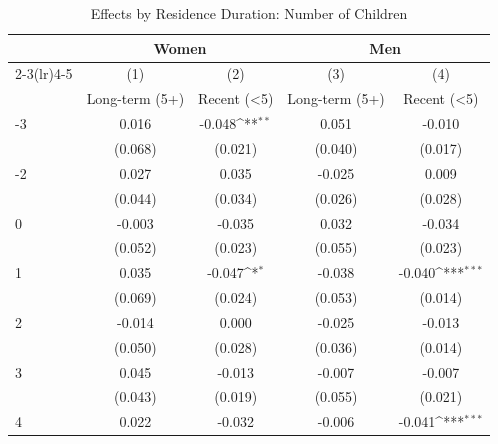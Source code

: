 \begin{table}[htbp]\centering
\def\sym#1{\ifmmode^{#1}\else\(^{#1}\)\fi}
\caption{Effects by Residence Duration: Number of Children}
\begin{tabular}{l*{4}{c}}
\hline\hline
            &\multicolumn{2}{c}{Women}                  &\multicolumn{2}{c}{Men}                    \\\cmidrule(lr){2-3}\cmidrule(lr){4-5}
            &\multicolumn{1}{c}{(1)}&\multicolumn{1}{c}{(2)}&\multicolumn{1}{c}{(3)}&\multicolumn{1}{c}{(4)}\\
            &\multicolumn{1}{c}{Long-term (5+)}&\multicolumn{1}{c}{Recent (<5)}&\multicolumn{1}{c}{Long-term (5+)}&\multicolumn{1}{c}{Recent (<5)}\\
\hline
-3          &       0.016         &      -0.048\sym{**} &       0.051         &      -0.010         \\
            &     (0.068)         &     (0.021)         &     (0.040)         &     (0.017)         \\
[1em]
-2          &       0.027         &       0.035         &      -0.025         &       0.009         \\
            &     (0.044)         &     (0.034)         &     (0.026)         &     (0.028)         \\
[1em]
0           &      -0.003         &      -0.035         &       0.032         &      -0.034         \\
            &     (0.052)         &     (0.023)         &     (0.055)         &     (0.023)         \\
[1em]
1           &       0.035         &      -0.047\sym{*}  &      -0.038         &      -0.040\sym{***}\\
            &     (0.069)         &     (0.024)         &     (0.053)         &     (0.014)         \\
[1em]
2           &      -0.014         &       0.000         &      -0.025         &      -0.013         \\
            &     (0.050)         &     (0.028)         &     (0.036)         &     (0.014)         \\
[1em]
3           &       0.045         &      -0.013         &      -0.007         &      -0.007         \\
            &     (0.043)         &     (0.019)         &     (0.055)         &     (0.021)         \\
[1em]
4           &       0.022         &      -0.032         &      -0.006         &      -0.041\sym{***}\\

\end{tabular}
\end{table}
